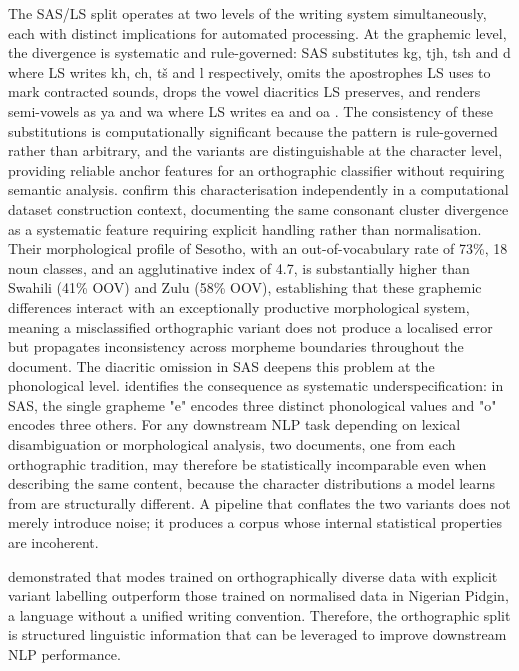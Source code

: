\documentclass[12pt]{ThesisRU}
\begin{document}
The SAS/LS split operates at two levels of the writing system simultaneously, each with distinct implications for automated processing. At the graphemic level, the divergence is systematic and rule-governed: SAS substitutes kg, tjh, tsh and d where LS writes kh, ch, tš and l respectively, omits the apostrophes LS uses to mark contracted sounds, drops the vowel diacritics LS preserves, and renders semi-vowels as ya and wa where LS writes ea and oa \citep{makutoane2022people}. The consistency of these substitutions is computationally significant because the pattern is rule-governed rather than arbitrary, and the variants are distinguishable at the character level, providing reliable anchor features for an orthographic classifier without requiring semantic analysis. \citet{motaung2025sesoda} confirm this characterisation independently in a computational dataset construction context, documenting the same consonant cluster divergence as a systematic feature requiring explicit handling rather than normalisation. Their morphological profile of Sesotho, with an out-of-vocabulary rate of 73\%, 18 noun classes, and an agglutinative index of 4.7, is substantially higher than Swahili (41\% OOV) and Zulu (58\% OOV), establishing that these graphemic differences interact with an exceptionally productive morphological system, meaning a misclassified orthographic variant does not produce a localised error but propagates inconsistency across morpheme boundaries throughout the document. The diacritic omission in SAS deepens this problem at the phonological level. \citet{matlosa2017sesotho} identifies the consequence as systematic underspecification: in SAS, the single grapheme "e" encodes three distinct phonological values and "o" encodes three others. For any downstream NLP task depending on lexical disambiguation or morphological analysis, two documents, one from each orthographic tradition, may therefore be statistically incomparable even when describing the same content, because the character distributions a model learns from are structurally different. A pipeline that conflates the two variants does not merely introduce noise; it produces a corpus whose internal statistical properties are incoherent.

\citet{lin-etal-2024-modeling} demonstrated that modes trained on orthographically diverse data with explicit variant labelling outperform those trained on normalised data in Nigerian Pidgin, a language without a unified writing convention. Therefore, the orthographic split is structured linguistic information that can be leveraged to improve downstream NLP performance.
\end{document}
